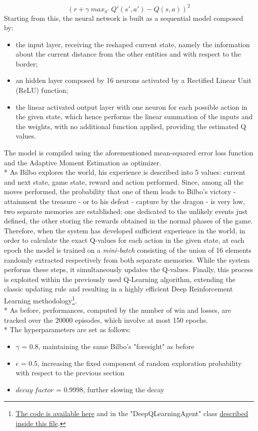 $$(r+\gamma\;max_{a'}\;Q'(s',a')-Q(s,a))^2$$
Starting from this, the neural network is built as a sequential model composed by:
\begin{itemize}
  \item the input layer, receiving the reshaped current state, namely the information about the current distance from the other entities and with respect to the border;
  \item an hidden layer composed by 16 neurons activated by a Rectified Linear Unit (ReLU) function; 
  \item the linear activated output layer with one neuron for each possible action in the given state, which hence performs the linear summation of the inputs and the weights, with no additional function applied, providing the estimated Q values.
\end{itemize}
The model is compiled using the aforementioned mean-squared error loss function and the Adaptive Moment Estimation as optimizer.\\*
As Bilbo explores the world, his experience is described into 5 values: current and next state, game state, reward and action performed. Since, among all the moves performed, the probability that one of them leads to Bilbo's victory - attainment the treasure - or to his defeat - capture by the dragon - is very low, two separate memories are established: one dedicated to the unlikely events just defined, the other storing the rewards obtained in the normal phases of the game. Therefore, when the system has developed sufficient experience in the world, in order to calculate the exact Q-values for each action in the given state, at each epoch the model is trained on a \textit{mini-batch} consisting of the union of 16 elements randomly extracted respectively from both separate memories. While the system performs these steps, it simultaneously updates the Q-values. Finally, this process is exploited within the previously used Q-Learning algorithm, extending the classic updating rule and resulting in a highly efficient Deep Reinforcement Learning methodology\footnote{\href{https://github.com/moiraghif/DragonHunting/blob/master/Bilbo\%20World/Bilbo_deep_feels.py}{The code is available here} and in the "DeepQLearningAgent" class \href{https://github.com/moiraghif/DragonHunting/blob/master/Bilbo\%20World/agents.py}{described inside this file}.}.\\*
As before, performances, computed by the number of win and losses, are tracked over the 20000 episodes, which involve at most 150 epochs.\\*
The hyperparameters are set as follows:
\begin{itemize}
  \item $\gamma$ = 0.8, maintaining the same Bilbo's "foresight" as before
  \item $\epsilon$ = 0.5, increasing the fixed component of random exploration probability with respect to the previous section
  \item $decay\;factor$ = 0.9998, further slowing the decay
\end{itemize} 

